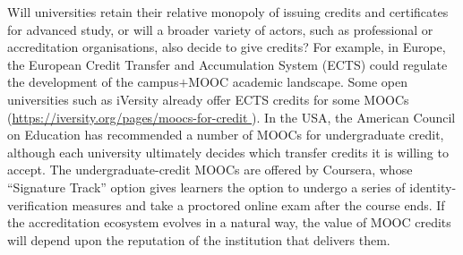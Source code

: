 Will universities retain their relative monopoly
of issuing credits and certificates for advanced study, or will a broader variety of actors,
such as professional or accreditation organisations, 
also decide to give credits?
For example, in Europe, the European Credit Transfer and Accumulation
System (ECTS) could regulate the
development of the campus$+$MOOC academic landscape.  Some open
universities such as iVersity already offer ECTS credits for some MOOCs
(\url{https://iversity.org/pages/moocs-for-credit }). 
In the USA, the
American Council on Education has recommended a number of
MOOCs for undergraduate credit, although each university ultimately
decides which transfer credits it is willing to accept.
The undergraduate-credit MOOCs are
offered by Coursera, whose ``Signature Track'' option gives learners the
option to  undergo  a series of identity-verification measures and take
a proctored online exam after the course ends.
If the accreditation ecosystem evolves in a natural
way, the value of MOOC credits will depend upon the reputation of the
institution that delivers them.

